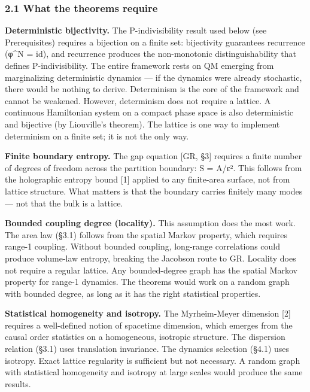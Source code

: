\documentclass[
]{article}
\begin{document}
\hypertarget{what-the-theorems-require}{%
\subsubsection{2.1 What the theorems
require}\label{what-the-theorems-require}}

\textbf{Deterministic bijectivity.} The P-indivisibility result used
below (see Prerequisites) requires a bijection on a finite set:
bijectivity guarantees recurrence (φ\^{}N = id), and recurrence produces
the non-monotonic distinguishability that defines P-indivisibility. The
entire framework rests on QM emerging from marginalizing deterministic
dynamics --- if the dynamics were already stochastic, there would be
nothing to derive. Determinism is the core of the framework and cannot
be weakened. However, determinism does not require a lattice. A
continuous Hamiltonian system on a compact phase space is also
deterministic and bijective (by Liouville's theorem). The lattice is one
way to implement determinism on a finite set; it is not the only way.

\textbf{Finite boundary entropy.} The gap equation {[}GR, §3{]} requires
a finite number of degrees of freedom across the partition boundary: S =
A/ε². This follows from the holographic entropy bound {[}1{]} applied to
any finite-area surface, not from lattice structure. What matters is
that the boundary carries finitely many modes --- not that the bulk is a
lattice.

\textbf{Bounded coupling degree (locality).} This assumption does the
most work. The area law (§3.1) follows from the spatial Markov property,
which requires range-1 coupling. Without bounded coupling, long-range
correlations could produce volume-law entropy, breaking the Jacobson
route to GR. Locality does not require a regular lattice. Any
bounded-degree graph has the spatial Markov property for range-1
dynamics. The theorems would work on a random graph with bounded degree,
as long as it has the right statistical properties.

\textbf{Statistical homogeneity and isotropy.} The Myrheim-Meyer
dimension {[}2{]} requires a well-defined notion of spacetime dimension,
which emerges from the causal order statistics on a homogeneous,
isotropic structure. The dispersion relation (§3.1) uses translation
invariance. The dynamics selection (§4.1) uses isotropy. Exact lattice
regularity is sufficient but not necessary. A random graph with
statistical homogeneity and isotropy at large scales would produce the
same results.
\end{document}
